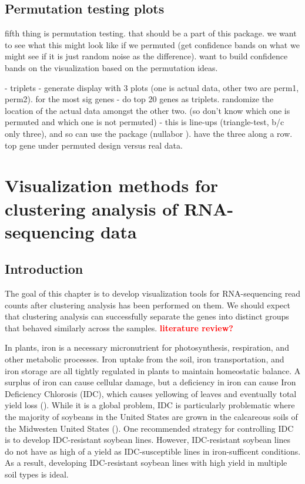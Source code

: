 \documentclass[11pt,a4paper,oldfontcommands,openany]{memoir}
\numberwithin{equation}{section} %
\begin{document}
\section{Permutation testing plots}

fifth thing is permutation testing. that should be a part of this package. we want to see what this might look like if we permuted (get confidence bands on what we might see if it is just random noise as the difference). want to build confidence bands on the visualization based on the permutation ideas.

- triplets - generate display with 3 plots (one is actual data, other two are perm1, perm2). for the most sig genes
- do top 20 genes as triplets. randomize the location of the actual data amongst the other two. (so don’t know which one is permuted and which one is not permuted)
- this is line-ups (triangle-test, b/c only three), and so can use the package (nullabor \citealt{nullabor}). have the three along a row. top gene under permuted design versus real data.


\chapter{Visualization methods for clustering analysis of RNA-sequencing data}

\section{Introduction}

The goal of this chapter is to develop visualization tools for RNA-sequencing read counts after clustering analysis has been performed on them. We should expect that clustering analysis can successfully separate the genes into distinct groups that behaved similarly across the samples. \textbf{\textcolor{Red}{literature review?}}

In plants, iron is a necessary micronutrient for photosynthesis, respiration, and other metabolic processes. Iron uptake from the soil, iron transportation, and iron storage are all tightly regulated in plants to maintain homeostatic balance. A surplus of iron can cause cellular damage, but a deficiency in iron can cause Iron Deficiency Chlorosis (IDC), which causes yellowing of leaves and eventually total yield loss (\citealt{soy1}). While it is a global problem, IDC is particularly problematic where the majority of soybeans in the United States are grown in the calcareous soils of the Midwesten United States (\citealt{soy3}). One recommended strategy for controlling IDC is to develop IDC-resistant soybean lines. However, IDC-resistant soybean lines do not have as high of a yield as IDC-susceptible lines in iron-sufficent conditions. As a result, developing IDC-resistant soybean lines with high yield in multiple soil types is ideal.
\end{document}
